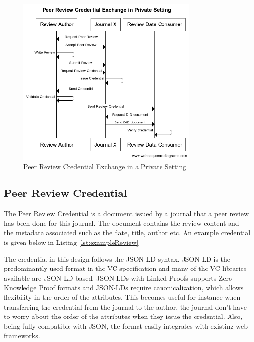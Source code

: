 \begin{figure}[htpb]
  \centering
  \includegraphics[width=0.8\textwidth]{figures/sequencePrivate.png}
  \caption{Peer Review Credential Exchange in a Private Setting} \label{fig:sequencePrivate}
\end{figure}

\subsection{Peer Review Credential}

The Peer Review Credential is a document issued by a journal that a peer review has been done for this journal. The document contains the review content and the metadata associated such as the date, title, author etc. An example credential is given below in Listing \ref{lst:exampleReview}



The credential in this design follows the \acrshort{JSON-LD} syntax. \acrshort{JSON-LD} is the predominantly used format in the \acrshort{VC} specification and many of the \acrshort{VC} libraries available are \acrshort{JSON-LD} based. \acrshort{JSON-LD}s with Linked Proofs supports Zero-Knowledge Proof formats and \acrshort{JSON-LD}s require canonicalization, which allows flexibility in the order of the attributes. This becomes useful for instance when transferring the credential from the journal to the author, the journal don't have to worry about the order of the attributes when they issue the credential. Also, being fully compatible with \acrshort{JSON}, the format easily integrates with existing web frameworks.

